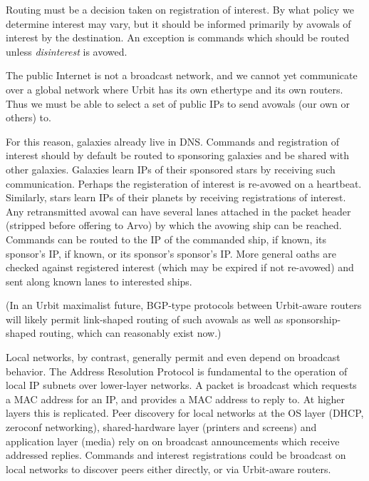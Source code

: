 Routing must be a decision taken on registration of interest. By what
policy we determine interest may vary, but it should be informed
primarily by avowals of interest by the destination. An exception is
commands which should be routed unless \emph{disinterest} is avowed.

The public Internet is not a broadcast network, and we cannot yet
communicate over a global network where Urbit has its own ethertype and
its own routers. Thus we must be able to select a set of public IPs to
send avowals (our own or others) to.

For this reason, galaxies already live in DNS. Commands and registration
of interest should by default be routed to sponsoring galaxies and be
shared with other galaxies. Galaxies learn IPs of their sponsored stars
by receiving such communication. Perhaps the registeration of interest
is re-avowed on a heartbeat. Similarly, stars learn IPs of their planets
by receiving registrations of interest. Any retransmitted avowal can
have several lanes attached in the packet header (stripped before
offering to Arvo) by which the avowing ship can be reached. Commands can
be routed to the IP of the commanded ship, if known, its sponsor's IP,
if known, or its sponsor's sponsor's IP. More general oaths are checked
against registered interest (which may be expired if not re-avowed) and
sent along known lanes to interested ships.

(In an Urbit maximalist future, BGP-type protocols between Urbit-aware
routers will likely permit link-shaped routing of such avowals as well
as sponsorship-shaped routing, which can reasonably exist now.)

Local networks, by contrast, generally permit and even depend on
broadcast behavior. The Address Resolution Protocol is fundamental to
the operation of local IP subnets over lower-layer networks. A packet is
broadcast which requests a MAC address for an IP, and provides a MAC
address to reply to. At higher layers this is replicated. Peer discovery
for local networks at the OS layer (DHCP, zeroconf networking),
shared-hardware layer (printers and screens) and application layer
(media) rely on on broadcast announcements which receive addressed
replies. Commands and interest registrations could be broadcast on local
networks to discover peers either directly, or via Urbit-aware routers.
